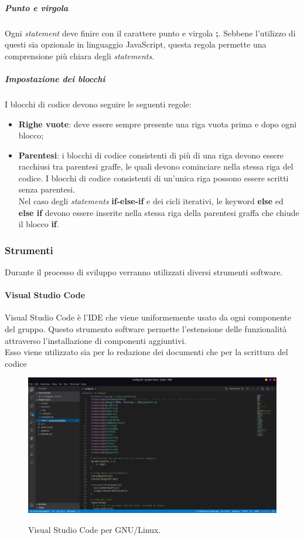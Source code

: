 \documentclass[../norme-di-progetto.tex]{subfiles}
\begin{document}
\subparagraph*{Punto e virgola}
Ogni \textit{statement} deve finire con il carattere punto e virgola \textbf{;}. Sebbene l'utilizzo di questi sia opzionale in linguaggio JavaScript, questa regola permette una comprensione più chiara degli \textit{statements}.

\subparagraph*{Impostazione dei blocchi}
I blocchi di codice devono seguire le seguenti regole:
\begin{itemize}
  \item \textbf{Righe vuote}: deve essere sempre presente una riga vuota prima e dopo ogni blocco;
  \item \textbf{Parentesi}: i blocchi di codice consistenti di più di una riga devono essere racchiusi tra parentesi graffe, le quali devono cominciare nella stessa riga del codice. I blocchi di codice consistenti di un'unica riga possono essere scritti senza parentesi. \\ Nel caso degli \textit{statements} \textbf{if-else-if} e dei cicli iterativi, le keyword \textbf{else} ed \textbf{else if} devono essere inserite nella stessa riga della parentesi graffa che chiude il blocco \textbf{if}.
\end{itemize}

\subsubsection{Strumenti}
Durante il processo di sviluppo verranno utilizzati diversi strumenti software.

\paragraph{Visual Studio Code}
Visual Studio Code è l'IDE che viene uniformemente usato da ogni componente del gruppo. Questo strumento software permette l'estensione delle funzionalità attraverso l'installazione di componenti aggiuntivi. \\
Esso viene utilizzato sia per lo redazione dei documenti che per la scrittura del codice

\begin{figure}[H]
  \centering
  \includegraphics[width=15cm]{img/vscode.png}
  \label{fig:github}
  \caption{Visual Studio Code per GNU/Linux.}
\end{figure}
\end{document}
